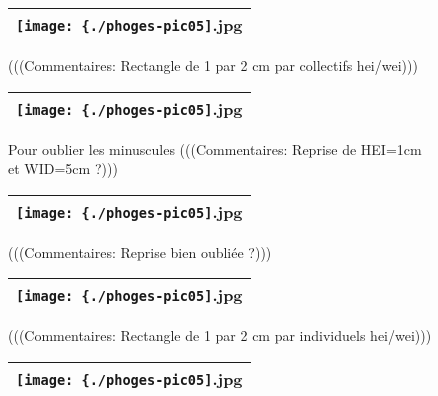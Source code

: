 \documentclass[12pt,twocolumn,french]{article}
\begin{document}
  \begin{figure}[H]
    \label{phoges-pic05.jpg}
    \noindent \centering{}
    \begin{tabular}{|c|}
      \hline
          \texttt{[image: \{./phoges-pic05]}.jpg}
        \tabularnewline \hline
    \end{tabular}
    \vspace{2mm}
    \caption{
      (((Commentaires: Rectangle de 1 par 2 cm par collectifs hei/wei)))
    }
  \end{figure}
  \begin{figure}[H]
    \label{phoges-pic05.jpg}
    \noindent \centering{}
    \begin{tabular}{|c|}
      \hline
          \texttt{[image: \{./phoges-pic05]}.jpg}
        \tabularnewline \hline
    \end{tabular}
    \vspace{2mm}
    \caption{
      Pour oublier les minuscules
      (((Commentaires: Reprise de HEI=1cm et WID=5cm ?)))
    }
  \end{figure}
  \begin{figure}[H]
    \label{phoges-pic05.jpg}
    \noindent \centering{}
    \begin{tabular}{|c|}
      \hline
          \texttt{[image: \{./phoges-pic05]}.jpg}
        \tabularnewline \hline
    \end{tabular}
    \vspace{2mm}
    \caption{
      (((Commentaires: Reprise bien oubliée ?)))
    }
  \end{figure}
  \begin{figure}[H]
    \label{phoges-pic05.jpg}
    \noindent \centering{}
    \begin{tabular}{|c|}
      \hline
          \texttt{[image: \{./phoges-pic05]}.jpg}
        \tabularnewline \hline
    \end{tabular}
    \vspace{2mm}
    \caption{
      (((Commentaires: Rectangle de 1 par 2 cm par individuels hei/wei)))
    }
  \end{figure}
  \begin{figure}[H]
    \label{phoges-pic05.jpg}
    \noindent \centering{}
    \begin{tabular}{|c|}
      \hline
          \texttt{[image: \{./phoges-pic05]}.jpg}
        \tabularnewline \hline
    \end{tabular}
    \vspace{2mm}
    \caption{
    }
  \end{figure}
\end{document}
